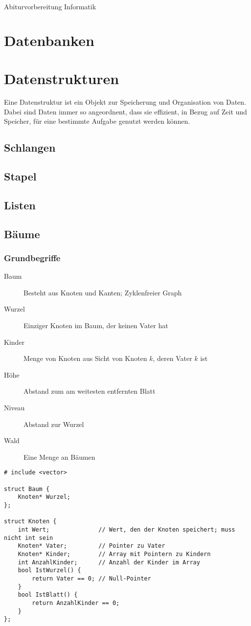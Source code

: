 \documentclass{article}
\begin{document}
\begin{titlepage}
    \begin{center}
        \Huge Abiturvorbereitung Informatik
    \end{center}
\end{titlepage}
\tableofcontents
\pagebreak
\section{Datenbanken}
\section{Datenstrukturen}
Eine Datenstruktur ist ein Objekt zur Speicherung und Organisation von Daten. Dabei sind Daten immer so angeordnent, dass sie effizient, in Bezug auf Zeit und Speicher, für eine bestimmte Aufgabe genutzt werden können.
\subsection{Schlangen}
\subsection{Stapel}
\subsection{Listen}
\subsection{Bäume}
\subsubsection{Grundbegriffe}
\begin{description}
    \item[Baum] Besteht aus Knoten und Kanten; Zyklenfreier Graph
    \item[Wurzel] Einziger Knoten im Baum, der keinen Vater hat
    \item[Kinder] Menge von Knoten aus Sicht von Knoten $k$, deren Vater $k$ ist  
    \item[Höhe] Abstand zum am weitesten entfernten Blatt
    \item[Niveau] Abstand zur Wurzel  
    \item[Wald] Eine Menge an Bäumen 
\end{description}
\begin{lstlisting}
# include <vector>

struct Baum {
    Knoten* Wurzel;
};

struct Knoten {
    int Wert;              // Wert, den der Knoten speichert; muss nicht int sein     
    Knoten* Vater;         // Pointer zu Vater
    Knoten* Kinder;        // Array mit Pointern zu Kindern
    int AnzahlKinder;      // Anzahl der Kinder im Array 
    bool IstWurzel() {
        return Vater == 0; // Null-Pointer
    }
    bool IstBlatt() {
        return AnzahlKinder == 0;
    }
};
\end{lstlisting}
\end{document}
